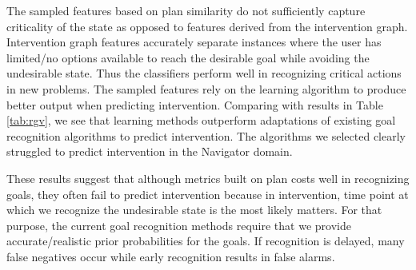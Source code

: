 \documentclass[letterpaper]{article}
\theoremstyle{plain}
\begin{document}
The sampled features based on plan similarity do not sufficiently capture criticality of the state as opposed to features derived from the intervention graph. Intervention graph features accurately separate instances where the user has limited/no options available to reach the desirable goal while avoiding the undesirable state. Thus the classifiers perform well in recognizing critical actions in new problems. The sampled features rely on the learning algorithm to produce better output when predicting intervention. 
Comparing with results in Table \ref{tab:rgv}, we see that learning methods outperform adaptations of existing goal recognition algorithms to predict intervention. The algorithms we selected clearly struggled to predict intervention in the Navigator domain. 

These results suggest that although metrics built on plan costs well in recognizing goals, they often fail to predict intervention because in intervention, time point at which we recognize the undesirable state is the most likely matters. For that purpose, the current goal recognition methods require that we provide accurate/realistic prior probabilities for the goals. If recognition is delayed, many false negatives occur while early recognition results in false alarms.

\end{document}
